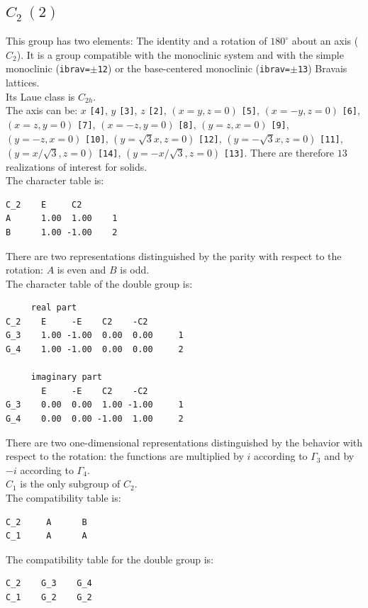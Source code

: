 \documentclass[12pt,a4paper]{article}
\begin{document}
\newpage
\subsection{\color{web-blue}$C_2\ (2)$}
This group has two elements: The identity and a rotation of $180^\circ$ 
about an axis ($C_2$).
It is a group compatible with the monoclinic system and with the
simple monoclinic (\texttt{ibrav=$\pm$12}) or the base-centered monoclinic 
(\texttt{ibrav=$\pm$13}) Bravais lattices. \\
Its Laue class is $C_{2h}$. \\
The axis can be:  
$x$ \texttt{[4]}, $y$ \texttt{[3]}, $z$ \texttt{[2]}, 
$(x=y, z=0)$ \texttt{[5]}, $(x=-y, z=0)$ \texttt{[6]}, 
$(x=z, y=0)$ \texttt{[7]}, 
$(x=-z, y=0)$ \texttt{[8]},
$(y=z, x=0)$ \texttt{[9]}, $(y=-z, x=0)$ \texttt{[10]}, 
$(y=\sqrt{3}x, z=0)$ \texttt{[12]}, $(y=-\sqrt{3}x, z=0)$ \texttt{[11]}, 
$(y=x/\sqrt{3}, z=0)$ \texttt{[14]}, $(y=-x/\sqrt{3}, z=0)$ \texttt{[13]}. 
There are therefore $13$ realizations of interest for solids. \\
The character table is:
\begin{verbatim}
C_2    E     C2
A      1.00  1.00    1
B      1.00 -1.00    2
\end{verbatim}
There are two representations distinguished by the parity
with respect to the rotation: $A$ is even and $B$ is odd.\\
The character table of the double group is:
\begin{verbatim}
     real part
C_2    E     -E    C2    -C2
G_3    1.00 -1.00  0.00  0.00     1
G_4    1.00 -1.00  0.00  0.00     2

     imaginary part
       E     -E    C2    -C2
G_3    0.00  0.00  1.00 -1.00     1
G_4    0.00  0.00 -1.00  1.00     2
\end{verbatim}
There are two one-dimensional representations distinguished by the 
behavior with respect to the rotation: the functions
are multiplied by $i$ according to $\Gamma_3$ and by $-i$ according to 
$\Gamma_4$.\\
$C_1$ is the only subgroup of $C_2$. \\
The compatibility table is:
\begin{verbatim}
C_2     A      B  
C_1     A      A
\end{verbatim}
The compatibility table for the double group is:
\begin{verbatim}
C_2    G_3    G_4 
C_1    G_2    G_2
\end{verbatim}
\end{document}
